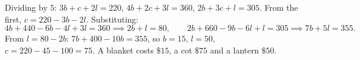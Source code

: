 Dividing by $5$: $3b+c+2l=220$, $4b+2c+3l=360$, $2b+3c+l=305$. From the first, $c=220-3b-2l$. Substituting:
\[
4b+440-6b-4l+3l=360\implies2b+l=80,\qquad2b+660-9b-6l+l=305\implies7b+5l=355 .
\]
From $l=80-2b$: $7b+400-10b=355$, so $b=15$, $l=50$, $c=220-45-100=75$. A blanket costs $\boxed{\$15}$, a cot $\boxed{\$75}$ and a lantern $\boxed{\$50}$.
